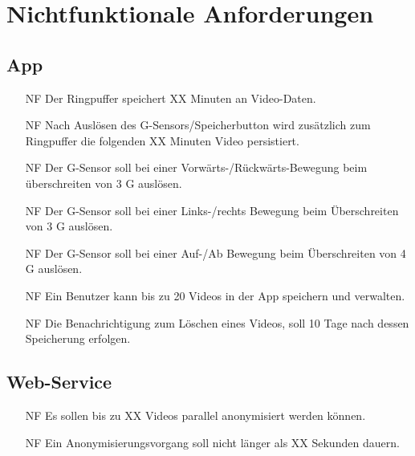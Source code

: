 \chapter{Nichtfunktionale Anforderungen}

\section{App}
\begin{itemize}
\item[NF] Der Ringpuffer speichert XX Minuten an Video-Daten.

\item[NF] Nach Auslösen des G-Sensors/Speicherbutton wird zusätzlich zum Ringpuffer die folgenden XX Minuten Video persistiert.

\item[NF] Der G-Sensor soll bei einer Vorwärts-/Rückwärts-Bewegung beim überschreiten von 3 G auslösen.

\item[NF] Der G-Sensor soll bei einer Links-/rechts Bewegung beim Überschreiten von 3 G auslösen.

\item[NF] Der G-Sensor soll bei einer Auf-/Ab Bewegung beim Überschreiten von 4 G auslösen.

\item[NF] Ein Benutzer kann bis zu 20 Videos in der App speichern und verwalten.

\item[NF] Die Benachrichtigung zum Löschen eines Videos, soll 10 Tage nach dessen Speicherung erfolgen.
\end{itemize}

\section{Web-Service}
\begin{itemize}

\item[NF] Es sollen bis zu XX Videos parallel anonymisiert werden können.

\item[NF] Ein Anonymisierungsvorgang soll nicht länger als XX Sekunden dauern.
\end{itemize}

